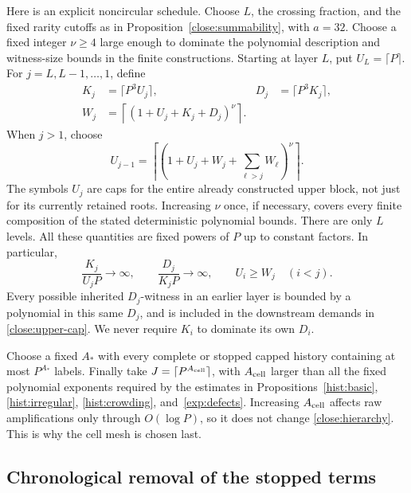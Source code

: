 Here is an explicit noncircular schedule. Choose $L$, the crossing
fraction, and the fixed rarity cutoffs as in
Proposition~\ref{close:summability}, with $a=32$. Choose a fixed
integer $\nu\geq4$ large enough to dominate the polynomial
description and witness-size bounds in the finite constructions.
Starting at layer $L$, put $U_L=\lceil P\rceil$. For
$j=L,L-1,\ldots,1$, define
\begin{align}
 K_j&=\lceil P^3U_j\rceil,&
 D_j&=\lceil P^3K_j\rceil, \label{close:cutoffs}\\
 W_j&=\left\lceil(1+U_j+K_j+D_j)^\nu\right\rceil. \nonumber
\end{align}
When $j>1$, choose
\begin{equation}\label{close:upper-cap}
 U_{j-1}=
 \left\lceil\left(1+U_j+W_j+
                 \sum_{\ell>j}W_\ell\right)^\nu\right\rceil.
\end{equation}
The symbols $U_j$ are caps for the entire already constructed
upper block, not just for its currently retained roots. Increasing
$\nu$ once, if necessary, covers every finite composition of the
stated deterministic polynomial bounds. There are only $L$
levels. All these quantities are fixed powers of $P$ up to
constant factors. In particular,
\begin{equation}\label{close:hierarchy}
 \frac{K_j}{U_jP}\longrightarrow\infty,\qquad
 \frac{D_j}{K_jP}\longrightarrow\infty,
 \qquad U_i\geq W_j\quad(i<j).
\end{equation}
Every possible inherited $D_j$-witness in an earlier layer is
bounded by a polynomial in this same $D_j$, and is included in
the downstream demands in \eqref{close:upper-cap}. We never
require $K_i$ to dominate its own $D_i$.

Choose a fixed $A_*$ with every complete or stopped capped
history containing at most $P^{A_*}$ labels. Finally take
$J=\lceil P^{A_{\rm cell}}\rceil$, with $A_{\rm cell}$ larger
than all the fixed polynomial exponents required by the estimates in
Propositions~\ref{hist:basic}, \ref{hist:irregular},
\ref{hist:crowding}, and~\ref{exp:defects}.
Increasing $A_{\rm cell}$ affects raw
amplifications only through $O(\log P)$, so it does not change
\eqref{close:hierarchy}. This is why the cell mesh is chosen last.

\subsection{Chronological removal of the stopped terms}

